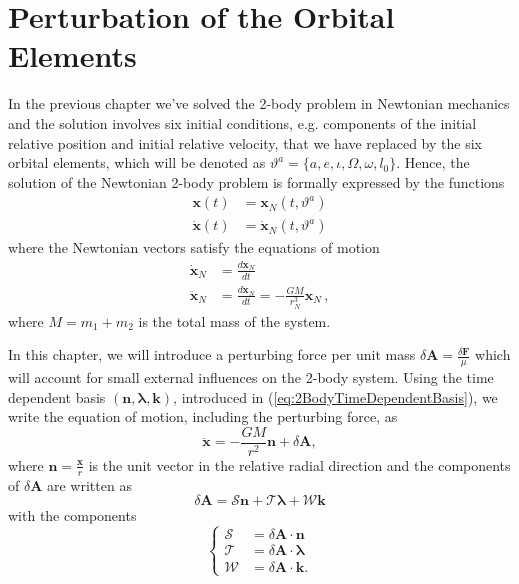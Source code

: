 \section{Perturbation of the Orbital Elements} \label{sec:PerturbationMethod}
In the previous chapter we've solved the 2-body problem in Newtonian mechanics and the solution involves six initial conditions, e.g. components of the initial relative position and initial relative velocity, that we have replaced by the six orbital elements, which will be denoted as $\vartheta ^a = \{ a,e, \iota, \Omega, \omega, l_0 \}$. Hence, the solution of the Newtonian 2-body problem is formally expressed by the functions
\begin{subequations} \label{eq:2BodyNewtonianSolution}
\begin{align}
\textbf{x} (t) &= \textbf{x}_N (t, \vartheta^a) \\
\dot{\textbf{x}} (t) &= \dot{\textbf{x}}_N (t, \vartheta^a)
\end{align}
\end{subequations}
where the Newtonian vectors satisfy the  equations of motion
\begin{subequations}
\begin{align}
\dot{\textbf{x}}_N &= \frac{d \textbf{x}_N}{dt} \\
\ddot{\textbf{x}}_N &= \frac{d \dot{\textbf{x}}_N}{dt} = - \frac{GM}{r_N^3} \textbf{x}_N \, ,
\end{align}
\end{subequations}
where $M=m_1 + m_2$ is the total mass of the system.

In this chapter, we will  introduce a perturbing force per unit mass $\delta \textbf{A}= \frac{\delta \textbf{F}}{\mu}$ which will account for small external influences on the 2-body system.  Using the time dependent basis $(\textbf{n}, \boldsymbol{\lambda}, \textbf{k})$, introduced in (\ref{eq:2BodyTimeDependentBasis}), we write the equation of motion, including the perturbing force, as
\begin{equation}
\ddot{\textbf{x}} = -\frac{GM}{r^2} \textbf{n} + \delta \textbf{A} ,
\end{equation}
where $\textbf{n} = \frac{\textbf{x}}{r}$ is the unit vector in the relative radial direction and the components of $\delta \textbf{A}$ are written as
\begin{equation}
\delta \textbf{A} = \mathcal{S} \textbf{n} + \mathcal{T} \boldsymbol{\lambda} + \mathcal{W} \textbf{k} \label{eq:PerturbingForce}
\end{equation}
with the components
\begin{equation} 
\begin{cases}
\mathcal{S} &= \delta \textbf{A} \cdot \textbf{n} \\
\mathcal{T} &=  \delta \textbf{A}  \cdot \boldsymbol{\lambda} \\
\mathcal{W} &=  \delta \textbf{A}  \cdot \textbf{k} .
\end{cases} \label{eq:PerturbingForceComponents}
\end{equation}

